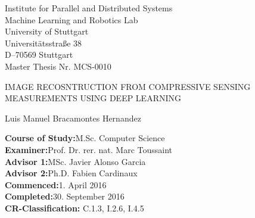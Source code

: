 \begin{titlepage}

\centering
\sffamily
%
\normalsize
Institute for Parallel and Distributed Systems \\
Machine Learning and Robotics Lab\\
\null\vspace{0.5cm}
University of Stuttgart\\
Universitätsstraße 38\\
D–70569 Stuttgart\\

\null\vspace{0.9cm}
Master Thesis Nr. MCS-0010

\large
\null\vspace{0.8cm}
{\huge IMAGE RECOSNTRUCTION FROM COMPRESSIVE SENSING MEASUREMENTS USING DEEP LEARNING\\[12pt] 
} 
\null\vspace{0.1cm}

\normalsize
Luis Manuel Bracamontes Hernandez

\raggedright
\null\vspace{0.7cm}
\textbf{Course of Study:}\null\hspace{0.1cm}M.Sc. Computer Science\\
\null\vspace{0.5cm}
\textbf{Examiner:}\null\hspace{0.1cm}Prof. Dr. rer. nat. Marc Toussaint\\
\null\vspace{0.01cm}
\textbf{Advisor 1:}\null\hspace{0.1cm}MSc. Javier Alonso Garcia\\
\textbf{Advisor 2:}\null\hspace{0.1cm}Ph.D. Fabien Cardinaux\\
\null\vspace{0.5cm}
\textbf{Commenced:}\null\hspace{0.1cm}1. April 2016\\
\null\vspace{0.01cm}
\textbf{Completed:}\null\hspace{0.1cm}30. September 2016\\
\null\vspace{0.5cm}
\textbf{CR-Classification:}\null\hspace{0.1cm} C.1.3, I.2.6, I.4.5 \\


\vspace{0.5cm}
\end{titlepage}



